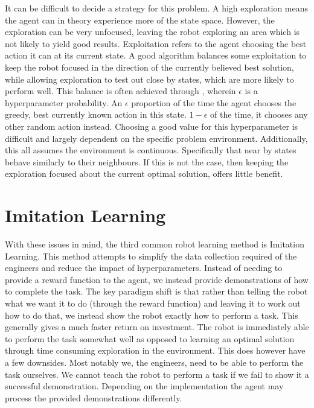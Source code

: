 It can be difficult to decide a strategy for this  problem. A high exploration means the agent can in theory experience more of the state space. However, the exploration can be very unfocused, leaving the robot exploring an area which is not likely to yield good results. Exploitation refers to the agent choosing the best action it can at its current state. A good algorithm balances some exploitation to keep the robot focused in the direction of the currently believed best solution, while allowing exploration to test out close by states, which are more likely to perform well. This balance is often achieved through , wherein $\epsilon$ is a hyperparameter probability. An $\epsilon$ proportion of the time the agent chooses the greedy, best currently known action in this state. $1-\epsilon$ of the time, it chooses any other random action instead. Choosing a good value for this hyperparameter is difficult and largely dependent on the specific problem environment. Additionally, this all assumes the environment is continuous. Specifically that near by states behave similarly to their neighbours. If this is not the case, then keeping the exploration focused about the current optimal solution, offers little benefit.

\section{Imitation Learning}
\label{sec:imitation-learning}
With these issues in mind, the third common robot learning method is Imitation Learning. This method attempts to simplify the data collection required of the engineers and reduce the impact of hyperparameters. Instead of needing to provide a reward function to the agent, we instead provide demonstrations of how to complete the task. The key paradigm shift is that rather than telling the robot what we want it to do (through the reward function) and leaving it to work out how to do that, we instead show the robot exactly how to perform a task. This generally gives a much faster return on investment. The robot is immediately able to perform the task somewhat well as opposed to learning an optimal solution through time consuming exploration in the environment. This does however have a few downsides. Most notably we, the engineers, need to be able to perform the task ourselves. We cannot teach the robot to perform a task if we fail to show it a successful demonstration. Depending on the implementation the agent may process the provided demonstrations differently. \\

